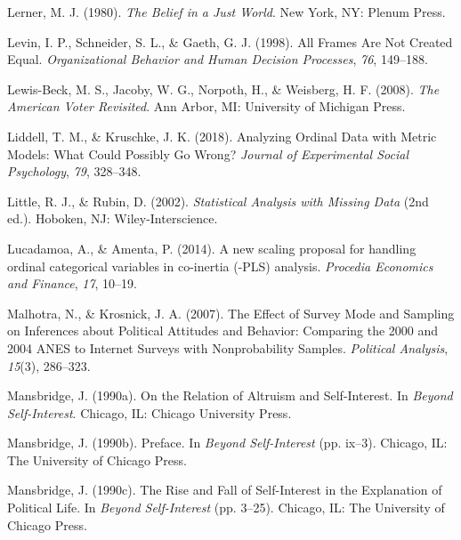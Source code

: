 \documentclass[12pt,econ]{sources/authesis}
\newenvironment{CSLReferences}%
  {}%
  {\par}
\begin{document}
\begin{CSLReferences}{1}{0}
\leavevmode{}%
Lerner, M. J. (1980). \emph{The {Belief} in a {Just} {World}}. New York, NY: Plenum Press.

\leavevmode{}%
Levin, I. P., Schneider, S. L., \& Gaeth, G. J. (1998). {All Frames Are Not Created Equal}. \emph{Organizational Behavior and Human Decision Processes}, \emph{76}, 149--188.

\leavevmode{}%
Lewis-Beck, M. S., Jacoby, W. G., Norpoth, H., \& Weisberg, H. F. (2008). \emph{{The American Voter Revisited}}. Ann Arbor, MI: University of Michigan Press.

\leavevmode{}%
Liddell, T. M., \& Kruschke, J. K. (2018). {Analyzing Ordinal Data with Metric Models: What Could Possibly Go Wrong?} \emph{Journal of Experimental Social Psychology}, \emph{79}, 328--348.

\leavevmode{}%
Little, R. J., \& Rubin, D. (2002). \emph{{Statistical Analysis with Missing Data}} (2nd ed.). Hoboken, NJ: Wiley-Interscience.

\leavevmode{}%
Lucadamoa, A., \& Amenta, P. (2014). A new scaling proposal for handling ordinal categorical variables in co-inertia (-PLS) analysis. \emph{Procedia Economics and Finance}, \emph{17}, 10--19.

\leavevmode{}%
Malhotra, N., \& Krosnick, J. A. (2007). {The Effect of Survey Mode and Sampling on Inferences about Political Attitudes and Behavior: Comparing the 2000 and 2004 ANES to Internet Surveys with Nonprobability Samples}. \emph{Political Analysis}, \emph{15}(3), 286--323.

\leavevmode{}%
Mansbridge, J. (1990a). {On the Relation of Altruism and Self-Interest}. In \emph{Beyond {Self}-{Interest}}. Chicago, IL: Chicago University Press.

\leavevmode{}%
Mansbridge, J. (1990b). Preface. In \emph{Beyond {Self}-{Interest}} (pp. ix--3). Chicago, IL: The University of Chicago Press.

\leavevmode{}%
Mansbridge, J. (1990c). The {Rise} and {Fall} of {Self}-{Interest} in the {Explanation} of {Political} {Life}. In \emph{Beyond {Self}-{Interest}} (pp. 3--25). Chicago, IL: The University of Chicago Press.


\end{CSLReferences}
\end{document}

